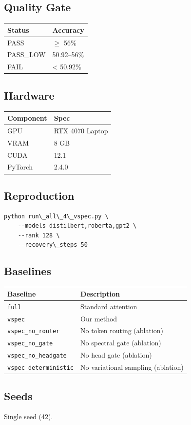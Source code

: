 \subsection{Quality Gate}

\begin{table}[H]
\centering
\small
\begin{tabular}{ll}
\toprule
\textbf{Status} & \textbf{Accuracy} \\
\midrule
PASS & $\ge$ 56\% \\
PASS\_LOW & 50.92--56\% \\
FAIL & \textless{} 50.92\% \\
\bottomrule
\end{tabular}
\end{table}

\subsection{Hardware}

\begin{table}[H]
\centering
\small
\begin{tabular}{ll}
\toprule
\textbf{Component} & \textbf{Spec} \\
\midrule
GPU & RTX 4070 Laptop \\
VRAM & 8 GB \\
CUDA & 12.1 \\
PyTorch & 2.4.0 \\
\bottomrule
\end{tabular}
\end{table}

\subsection{Reproduction}

\begin{lstlisting}
python run\_all\_4\_vspec.py \
    --models distilbert,roberta,gpt2 \
    --rank 128 \
    --recovery\_steps 50
\end{lstlisting}

\subsection{Baselines}

\begin{table}[H]
\centering
\small
\begin{tabular}{ll}
\toprule
\textbf{Baseline} & \textbf{Description} \\
\midrule
\texttt{full} & Standard attention \\
\texttt{vspec} & Our method \\
\texttt{vspec\_no\_router} & No token routing (ablation) \\
\texttt{vspec\_no\_gate} & No spectral gate (ablation) \\
\texttt{vspec\_no\_headgate} & No head gate (ablation) \\
\texttt{vspec\_deterministic} & No variational sampling (ablation) \\
\bottomrule
\end{tabular}
\end{table}

\subsection{Seeds}

Single seed (42).

